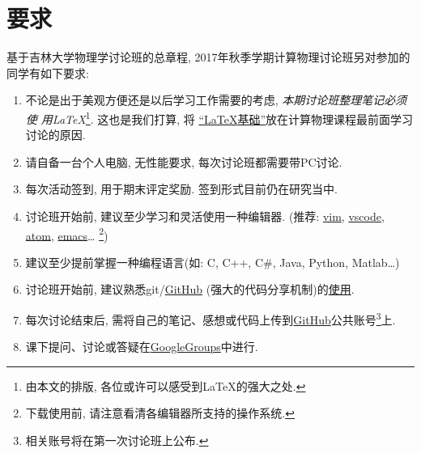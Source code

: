 \documentclass[10pt,a4paper, twocolumn]{article}
\begin{document}
  \section{要求}
  基于吉林大学物理学讨论班的总章程, 2017年秋季学期计算物理讨论班另对参加的同学有如下要求:
  \begin{enumerate}
    \item 不论是出于美观方便还是以后学习工作需要的考虑, \emph{本期讨论班整理笔记必须使
          用{\LaTeX}}\footnote{由本文的排版, 各位或许可以感受到{\LaTeX}的强大之处.}.
          这也是我们打算, 将
          \href{https://github.com/louisstuart96/lshort-new-zh-cn/blob/%
                master/lshort-zh-cn.pdf}
          {``{\LaTeX}基础''}放在计算物理课程最前面学习讨论的原因.
    \item 请自备一台个人电脑, 无性能要求, 每次讨论班都需要带PC讨论.
    \item 每次活动签到, 用于期末评定奖励. 签到形式目前仍在研究当中.
    \item 讨论班开始前, 建议至少学习和灵活使用一种编辑器.
    (推荐: \href{http://www.vim.org/}{vim},
          \href{https://code.visualstudio.com}{vscode},
          \href{https://atom.io}{atom},
          \href{http://www.gnu.org/software/emacs/}{emacs}\ldots
          \footnote{下载使用前, 请注意看清各编辑器所支持的操作系统.})
    \item 建议至少提前掌握一种编程语言(如: C, C++, C\#, Java, Python, Matlab\ldots)
    \item 讨论班开始前, 建议熟悉git/\href{https://github.com}{GitHub}
          (强大的代码分享机制)的\href{https://git-scm.com/book/zh/v2}{使用}.
    \item 每次讨论结束后, 需将自己的笔记、感想或代码上传到\href{https://github.com}
          {GitHub}公共账号\footnote{相关账号将在第一次讨论班上公布.}上.
    \item 课下提问、讨论或答疑在\href{https://github.com/JLUComPhy/JLU_Computat%
                ional_Physics/blob/master/JPAs_Discussion.md}{GoogleGroups}中进行.
  \end{enumerate}
\end{document}
